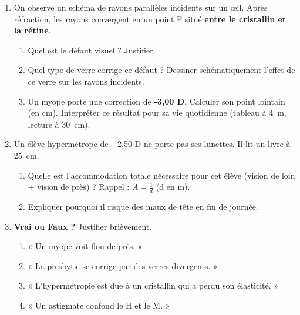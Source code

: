 \documentclass[11pt]{article}
\begin{document}
\begin{exercice}
\begin{enumerate}
    \item On observe un schéma de rayons parallèles incidents sur un œil. Après réfraction, les rayons convergent en un point F situé \textbf{entre le cristallin et la rétine}.
    \begin{enumerate}
        \item Quel est le défaut visuel ? Justifier.
        \item Quel type de verre corrige ce défaut ? Dessiner schématiquement l'effet de ce verre sur les rayons incidents.
        \item Un myope porte une correction de \textbf{-3,00 D}. Calculer son point lointain (en cm). Interpréter ce résultat pour sa vie quotidienne (tableau à \SI{4}{m}, lecture à \SI{30}{cm}).
    \end{enumerate}
    \item Un élève hypermétrope de +2,50 D ne porte pas ses lunettes. Il lit un livre à \SI{25}{cm}.
    \begin{enumerate}
        \item Quelle est l'accommodation totale nécessaire pour cet élève (vision de loin + vision de près) ? Rappel : $A = \frac{1}{d}$ (d en m).
        \item Expliquer pourquoi il risque des maux de tête en fin de journée.
    \end{enumerate}
    \item \textbf{Vrai ou Faux ?} Justifier brièvement.
    \begin{enumerate}
        \item « Un myope voit flou de près. »
        \item « La presbytie se corrige par des verres divergents. »
        \item « L'hypermétropie est due à un cristallin qui a perdu son élasticité. »
        \item « Un astigmate confond le H et le M. »
    \end{enumerate}
\end{enumerate}
\end{exercice}
\end{document}
